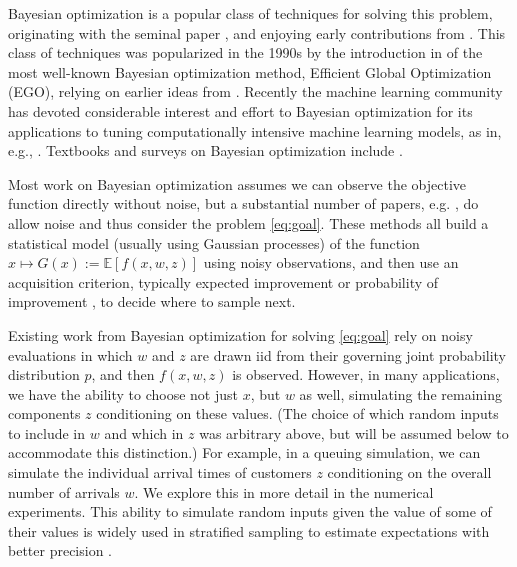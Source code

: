 \documentclass{article}
\newcommand{\w}{w}
\newcommand{\z}{z}
\newcommand{\pfcomment}[1]{{\color{red} PF: #1}}
\begin{document}
Bayesian optimization is a popular class of techniques for solving this problem, originating with the seminal paper \cite{kushner}, and enjoying early contributions from \cite{Mockus:1978,Mockus:1989}. This class of techniques was popularized in the 1990s by the introduction in \cite{jones1998efficient} of the most well-known Bayesian optimization method, Efficient Global Optimization (EGO), relying on earlier ideas from \cite{Mockus:1989}. Recently the machine learning community has devoted considerable interest and effort to Bayesian optimization for its applications to tuning computationally intensive machine learning models, as in, e.g., \cite{snoek2012practical}. Textbooks and surveys on Bayesian optimization include \cite{forrester2008engineering,brochu2010tutorial}.

Most work on Bayesian optimization assumes we can observe the objective function directly without noise, but a substantial number of papers, e.g. \cite{villemonteix2009informational,huang2006global,scott2011correlated,brochu2010tutorial}, do allow noise and thus consider the problem \eqref{eq:goal}. These methods all build a statistical model (usually using Gaussian processes) of the function $x \mapsto G(x) := \mathbb{E}[f(x,\w,\z)]$ using noisy observations, and then use an acquisition criterion, typically expected improvement or probability of improvement \cite{brochu2010tutorial}, to decide where to sample next.

Existing work from Bayesian optimization for solving \eqref{eq:goal} rely on noisy evaluations in which $\w$ and $\z$ are drawn iid from their governing joint probability distribution $p$, and then $f(x,\w,\z)$ is observed.
However, in many applications, we have the ability to choose not just $x$, but $\w$ as well, simulating the remaining components $\z$ conditioning on these values.
(The choice of which random inputs to include in $\w$ and which in $\z$ was arbitrary above, but will be assumed below to accommodate this distinction.)
For example, in a queuing simulation, we can simulate the individual arrival times of customers $\z$ conditioning on the overall number of arrivals $\w$. We explore this in more detail in the numerical experiments. This ability to simulate random inputs given the value of some of their values is widely used in stratified sampling to estimate expectations with better precision \cite{glasserman2003monte}. 

\end{document}
